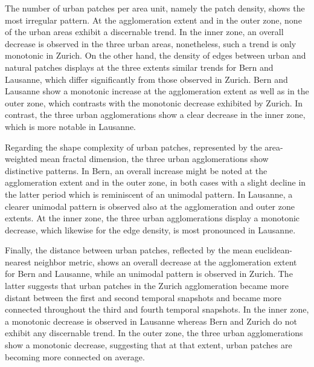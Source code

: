The number of urban patches per area unit, namely the patch density, shows the most irregular pattern. At the agglomeration extent and in the outer zone, none of the urban areas exhibit a discernable trend. %
In the inner zone, an overall decrease is observed in the three urban areas, nonetheless, such a trend is only monotonic in Zurich. %
On the other hand, the density of edges between urban and natural patches displays at the three extents similar trends for Bern and Lausanne, which differ significantly from those observed in Zurich. Bern and Lausanne show a monotonic increase at the agglomeration extent as well as in the outer zone, which contrasts with the monotonic decrease exhibited by Zurich. In contrast, the three urban agglomerations show a clear decrease in the inner zone, which is more notable in Lausanne. 

Regarding the shape complexity of urban patches, represented by the area-weighted mean fractal dimension, the three urban agglomerations show distinctive patterns. In Bern, an overall increase might be noted at the agglomeration extent and in the outer zone, in both cases with a slight decline in the latter period which is reminiscent of an unimodal pattern. In Lausanne, a clearer unimodal pattern is observed also at the agglomeration and outer zone extents. At the inner zone, the three urban agglomerations display a monotonic decrease, which likewise for the edge density, is most pronounced in Lausanne.

Finally, the distance between urban patches, reflected by the mean euclidean-nearest neighbor metric, shows an overall decrease at the agglomeration extent for Bern and Lausanne, while an unimodal pattern is observed in Zurich. The latter suggests that urban patches in the Zurich agglomeration became more distant between the first and second temporal snapshots and became more connected throughout the third and fourth temporal snapshots. In the inner zone, a monotonic decrease is observed in Lausanne whereas Bern and Zurich do not exhibit any discernable trend. In the outer zone, the three urban agglomerations show a monotonic decrease, suggesting that at that extent, urban patches are becoming more connected on average.

